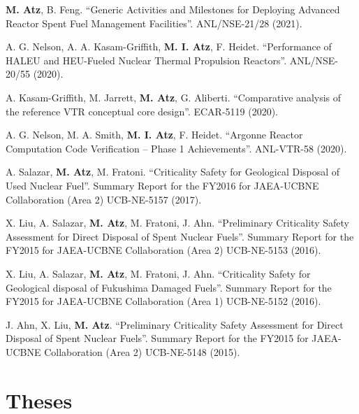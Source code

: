 \documentclass[margin,line]{resume}
\begin{document}
\begin{resume}
\begin{bibenum}
    \item \textbf{M. Atz}, B. Feng. ``Generic Activities and Milestones for Deploying Advanced Reactor Spent Fuel Management Facilities''. ANL/NSE-21/28 (2021).
    
    \item A. G. Nelson, A. A. Kasam-Griffith, \textbf{M. I. Atz}, F. Heidet. ``Performance of HALEU and HEU-Fueled Nuclear Thermal Propulsion Reactors''. ANL/NSE-20/55 (2020).
    
    \item A. Kasam-Griffith, M. Jarrett, \textbf{M. Atz}, G. Aliberti. ``Comparative analysis of the reference VTR conceptual core design''. ECAR-5119 (2020).

    \item A. G. Nelson, M. A. Smith, \textbf{M. I. Atz}, F. Heidet. ``Argonne Reactor Computation Code Verification -- Phase 1 Achievements''. ANL-VTR-58 (2020).

    \item A. Salazar, \textbf{M. Atz}, M. Fratoni. ``Criticality Safety for Geological Disposal of Used Nuclear Fuel''. Summary Report for the FY2016 for JAEA-UCBNE Collaboration (Area 2) UCB-NE-5157 (2017).
    
    \item X. Liu, A. Salazar, \textbf{M. Atz}, M. Fratoni, J. Ahn. ``Preliminary Criticality Safety Assessment for Direct Disposal of Spent Nuclear
	Fuels''. Summary Report for the FY2015 for JAEA-UCBNE Collaboration (Area 2) UCB-NE-5153 (2016).
	
	\item X. Liu, A. Salazar, \textbf{M. Atz}, M. Fratoni, J. Ahn. ``Criticality Safety for Geological disposal of Fukushima Damaged Fuels''. Summary Report for the FY2015 for JAEA-UCBNE Collaboration (Area 1) UCB-NE-5152 (2016).

    \item J. Ahn, X. Liu, \textbf{M. Atz}. ``Preliminary Criticality Safety Assessment for Direct Disposal of Spent Nuclear Fuels''. Summary Report for the FY2015 for JAEA-UCBNE Collaboration (Area 2) UCB-NE-5148 (2015).

\end{bibenum}
\section{\mysidestyle Theses\\}
\begin{bibenum}
    

\end{bibenum}
\end{resume}
\end{document}
